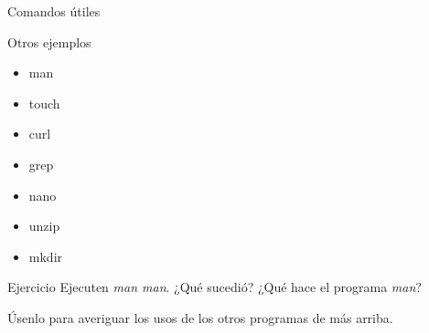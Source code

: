 \begin{frame}{Comandos útiles}

\begin{block} {Otros ejemplos}
        \begin{itemize}
        \item man
        \item touch
        \item curl
        \item grep
        \item nano
        \item unzip
        \item mkdir
    \end{itemize}
\end{block}

    \begin{ejercicio}{Ejercicio}
        Ejecuten \textit{man man}. ¿Qué sucedió? ¿Qué hace el programa \textit{man}?

        Úsenlo para averiguar los usos de los otros programas de más arriba.

    \end{ejercicio}
    
\end{frame}
